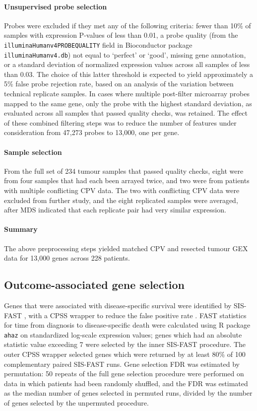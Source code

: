 \documentclass[dissertation.tex]{subfiles}
\begin{document}
\paragraph{Unsupervised probe selection}
Probes were excluded if they met any of the following criteria: fewer than 10\% of samples with expression P-values of less than 0.01, a probe quality (from the \texttt{illuminaHumanv4PROBEQUALITY} field in Bioconductor package \texttt{illuminaHumanv4.db}) not equal to `perfect' or `good', missing gene annotation, or a standard deviation of normalized expression values across all samples of less than 0.03.  The choice of this latter threshold is expected to yield approximately a 5\% false probe rejection rate, based on an analysis of the variation between technical replicate samples.  In cases where multiple post-filter microarray probes mapped to the same gene, only the probe with the highest standard deviation, as evaluated across all samples that passed quality checks, was retained.  The effect of these combined filtering steps was to reduce the number of features under consideration from 47,273 probes to 13,000, one per gene.

\paragraph{Sample selection}  From the full set of 234 tumour samples that passed quality checks, eight were from four samples that had each been arrayed twice, and two were from patients with multiple conflicting \gls{CPV} data.  The two with conflicting \gls{CPV} data were excluded from further study, and the eight replicated samples were averaged, after \gls{MDS} indicated that each replicate pair had very similar expression.

\paragraph{Summary}
The above preprocessing steps yielded matched \gls{CPV} and resected tumour \gls{GEX} data for 13,000 genes across 228 patients.

\subsection{Outcome-associated gene selection}
Genes that were associated with disease-specific survival were identified by \gls{SIS}-\gls{FAST} \cite{Gorst-Rasmussen2013}, with a \gls{CPSS} wrapper to reduce the false positive rate \cite{Shah2013}.  \gls{FAST} statistics for time from diagnosis to disease-specific death were calculated using R package \texttt{ahaz} on standardized log-scale expression values; genes which had an absolute statistic value exceeding 7 were selected by the inner \gls{SIS}-\gls{FAST} procedure.  The outer \gls{CPSS} wrapper selected genes which were returned by at least 80\% of 100 complementary paired \gls{SIS}-\gls{FAST} runs.  Gene selection \gls{FDR} was estimated by permutation: 50 repeats of the full gene selection procedure were performed on data in which patients had been randomly shuffled, and the \gls{FDR} was estimated as the median number of genes selected in permuted runs, divided by the number of genes selected by the unpermuted procedure.
\end{document}
